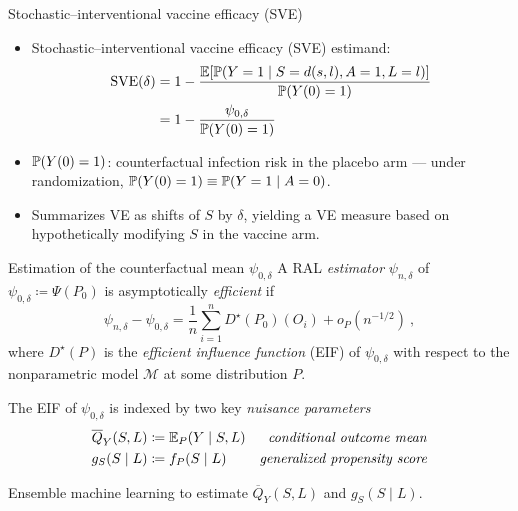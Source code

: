\documentclass{beamer}
\begin{document}
\begin{frame}[c]{Stochastic--interventional vaccine efficacy (SVE)}

\begin{center}
\begin{itemize}
  \itemsep8pt
  \item Stochastic--interventional vaccine efficacy (SVE) estimand:
  \begin{align*}
    \text{SVE}(\delta) &= 1 - \frac{\mathbb{E}[\mathbb{P}(Y = 1 \mid S = d(s, l), A = 1,
                                    L = l)]}{\mathbb{P}(Y(0)=1)} \\
                       &= 1 - \frac{\psi_{0, \delta}}{\mathbb{P}(Y(0)=1)}
  \end{align*}
  \item $\mathbb{P}(Y(0)=1)$: counterfactual infection risk in the placebo arm ---
    under randomization, $\mathbb{P}(Y(0)=1) \equiv \mathbb{P}(Y=1 \mid A=0)$.
  \item Summarizes VE as shifts of $S$ by $\delta$, yielding a VE measure based
    on hypothetically modifying $S$ in the vaccine arm.
\end{itemize}
\end{center}

\note{
}


\end{frame}


\begin{frame}{Estimation of the counterfactual mean $\psi_{0,\delta}$}
A RAL \textit{estimator} $\psi_{n,\delta}$ of $\psi_{0,\delta} \coloneqq
\Psi(P_0)$ is asymptotically \textit{efficient} if
\[
  \psi_{n,\delta} - \psi_{0, \delta} = \frac{1}{n} \sum_{i=1}^n
  D^{\star}(P_0)(O_i) + o_P(n^{-1/2}) \ ,
\]
where $D^{\star}(P)$ is the \textit{efficient influence function} (EIF) of
$\psi_{0,\delta}$ with respect to the nonparametric model $\mathcal{M}$ at some
distribution $P$.
\vspace{0.2cm}

The EIF of $\psi_{0,\delta}$ is indexed by two key \textit{nuisance parameters}
\begin{align*}
  \overline{Q}_{Y}(S,L) &\coloneqq \mathbb{E}_{P}(Y \mid S, L) &
      \mbox{\textit{conditional outcome mean}} \\
  g_{S}(S \mid L) &\coloneqq f_P(S \mid L) &
    \mbox{\textit{generalized propensity score}}
\end{align*}
\vspace{-0.2cm}

Ensemble machine learning to estimate $\overline{Q}_{Y}(S,L)$ and $g_{S}(S \mid
L)$.

\note{
}

\end{frame}
\end{document}
